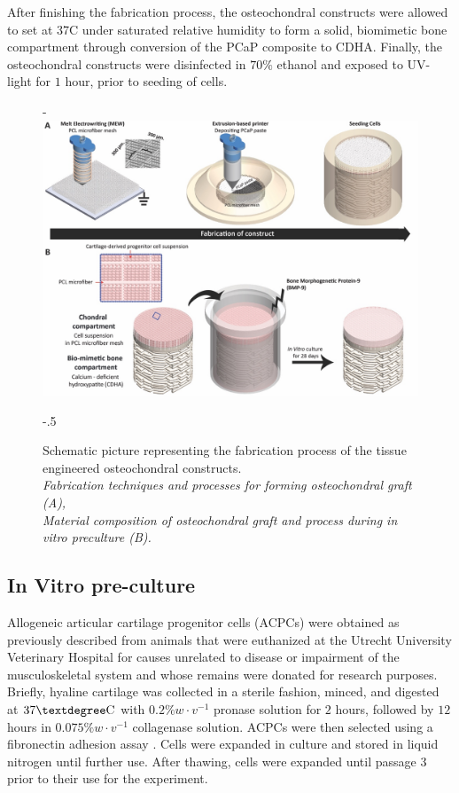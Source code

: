 \documentclass[twocolumn, empirical, authordate, issue]{jote-new-article}
\begin{document}
After finishing the fabrication process, the osteochondral constructs were allowed to set at 37\textdegree C under saturated relative humidity to form a solid, biomimetic bone compartment through conversion of the PCaP composite to CDHA. Finally, the osteochondral constructs were disinfected in $70\%$ ethanol and exposed to UV-light for $1$ hour, prior to seeding of cells.

\begin{figure}[t!]
\captionsetup{width=\dimexpr \linewidth + \fullwidthlen\relax}
\begin{adjustwidth}{-\fullwidthlen}{}
\includegraphics[width=\linewidth]{media/image2.jpg}
\end{adjustwidth}
\begin{adjustwidth}{-.5\fullwidthlen}{}

\caption{Schematic picture representing the fabrication process of the tissue engineered osteochondral constructs.\\ \emph{Fabrication techniques and processes for forming osteochondral graft (A),\\ Material composition of osteochondral graft and process during in vitro preculture (B).}}
\label{fig:figure2}
\end{adjustwidth}
\end{figure}
\subsection{In Vitro pre-culture} 

Allogeneic articular cartilage progenitor cells (ACPCs) were obtained as previously described \parencite{Levato2017, Williams2010} from animals that were euthanized at the Utrecht University Veterinary Hospital for causes unrelated to disease or impairment of the musculoskeletal system and whose remains were donated for research purposes. Briefly, hyaline cartilage was collected in a sterile fashion, minced, and digested at $37\textdegree \text{C}$ with $0.2\% w\cdot v^{-1}$ pronase solution for $2$ hours, followed by $12$ hours in $0.075\%
w\cdot v^{-1}$ collagenase solution. ACPCs were then selected using a fibronectin adhesion assay \parencite{Levato2017}. Cells were expanded in culture and stored in liquid nitrogen until further use. After thawing, cells were expanded until passage 3 prior to their use for the experiment.
\end{document}
